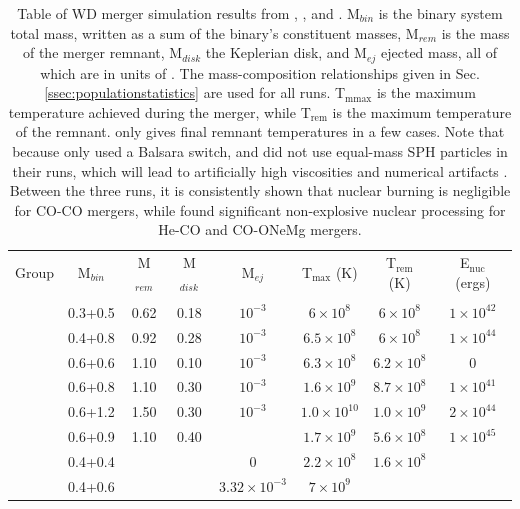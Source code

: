 \begin{table}
\centering
\caption{Table of WD merger simulation results from \cite{guerig04}, \cite{loreig09}, \cite{yoonpr07} and \cite{pakm+10}.  M$_{bin}$ is the binary system total mass, written as a sum of the binary's constituent masses, M$_{rem}$ is the mass of the merger remnant, M$_{disk}$ the Keplerian disk, and M$_{ej}$ ejected mass, all of which are in units of {\Msun}.  The mass-composition relationships given in Sec. \ref{ssec:populationstatistics} are used for all runs.  T$_\mathrm{mmax}$ is the maximum temperature achieved during the merger, while T$_\mathrm{rem}$ is the maximum temperature of the remnant.  \citeauthor{guerig04} only gives final remnant temperatures in a few cases.  Note that because \citeauthor{guerig04} only used a Balsara switch, and did not use equal-mass SPH particles in their runs, which will lead to artificially high viscosities and numerical artifacts \cite{loreig09}.  Between the three runs, it is consistently shown that nuclear burning is negligible for CO-CO mergers, while \citeauthor{loreig09} found significant non-explosive nuclear processing for He-CO and CO-ONeMg mergers.}
\begin{tabular}{cccccccc}
\hline & \\[-1em]\hline
Group & M$_{bin}$ & M$_{rem}$ & M$_{disk}$ & M$_{ej}$ & T$_\mathrm{max}$ (K) & T$_\mathrm{rem}$ (K) & E$_\mathrm{nuc}$ (ergs)\\
\hline & \\[-1em]\hline
\citeauthor{loreig09}	& 0.3+0.5	& 0.62 & 0.18 & $10^{-3}$ & $6 \times 10^{8}$ & $6 \times 10^{8}$ & $1 \times 10^{42}$ \\
	& 0.4+0.8	& 0.92 & 0.28 & $10^{-3}$ & $6.5 \times 10^{8}$ & $6 \times 10^{8}$ & $1 \times 10^{44}$ \\
	& 0.6+0.6	& 1.10 & 0.10 & $10^{-3}$ & $6.3 \times 10^{8}$ & $6.2 \times 10^{8}$ & 0 \\
	& 0.6+0.8	& 1.10 & 0.30 & $10^{-3}$ & $1.6 \times 10^{9}$ & $8.7 \times 10^{8}$ & $1 \times 10^{41}$ \\
	& 0.6+1.2	& 1.50 & 0.30 & $10^{-3}$ & $1.0 \times 10^{10}$ & $1.0 \times 10^{9}$ & $2 \times 10^{44}$ \\
\hline
\citeauthor{yoonpr07}	& 0.6+0.9 & 1.10 & 0.40 & & $1.7 \times 10^{9}$ & $5.6 \times 10^{8}$ & $1 \times 10^{45}$ \\
\hline
\citeauthor{guerig04}	& 0.4+0.4	& & & 0 & $2.2 \times 10^8$ & $1.6 \times 10^8$ & \\
	& 0.4+0.6	& & & $3.32 \times 10^{-3}$ & $7 \times 10^{9}$ & & \\

\end{tabular}
\end{table}
